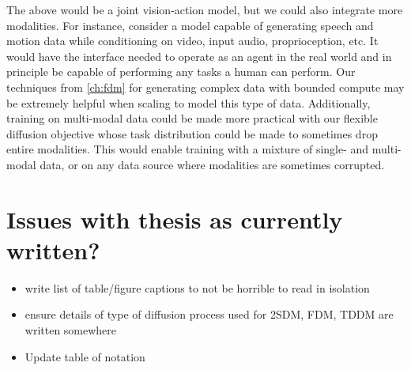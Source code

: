 The above would be a joint vision-action model, but we could also integrate more modalities. For instance, consider a model capable of generating speech and motion data while conditioning on video, input audio, proprioception, etc. It would have the interface needed to operate as an agent in the real world and in principle be capable of performing any tasks a human can perform. Our techniques from \cref{ch:fdm} for generating complex data with bounded compute may be extremely helpful when scaling to model this type of data. Additionally, training on multi-modal data could be made more practical with our flexible diffusion objective whose task distribution could be made to sometimes drop entire modalities. This would enable training with a mixture of single- and multi-modal data, or on any data source where modalities are sometimes corrupted.




\section*{Issues with thesis as currently written?}

\begin{itemize}
    \item write list of table/figure captions to not be horrible to read in isolation
    \item ensure details of type of diffusion process used for 2SDM, FDM, TDDM are written somewhere
    \item Update table of notation
\end{itemize}

